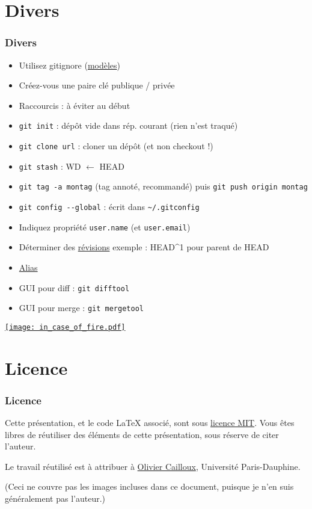 \documentclass[english, french]{beamer}
\begin{document}
\section{Divers}
\begin{frame}
	\frametitle{Divers}
	\vspace{-1pt}
	\begin{itemize}
		\item Utilisez gitignore {\tiny (\href{https://github.com/github/gitignore}{modèles})}
		\item Créez-vous une paire clé publique / privée
		\item Raccourcis : à éviter au début
		\item \texttt{git init} : dépôt vide dans rép. courant (rien n’est traqué)
		\item \texttt{git clone url} : cloner un dépôt (et non checkout !)
		\item \texttt{git stash} : WD $←$ HEAD
		\item \texttt{git tag -a montag} {\tiny (tag annoté, recommandé)} puis \texttt{git push origin montag}
		\item \texttt{git config -{}-global} : écrit dans \texttt{\textasciitilde/.gitconfig}
		\item Indiquez propriété \texttt{user.name} (et \texttt{user.email})
		\item Déterminer des \href{https://git-scm.com/book/en/v2/Git-Tools-Revision-Selection}{révisions} {\tiny exemple : HEAD\textasciicircum 1 pour parent de HEAD}
		\item \href{https://git-scm.com/book/en/v2/Git-Basics-Git-Aliases}{Alias}
		\item GUI pour diff : \texttt{git difftool}
		\item GUI pour merge : \texttt{git mergetool}
	\end{itemize}
\end{frame}

\begin{frame}
	\href{https://github.com/louim/in-case-of-fire}{\texttt{[image: in\_case\_of\_fire.pdf]}}
\end{frame}

\appendix
\AtBeginSection{
}

\section{Licence}
\begin{frame}
	\frametitle{Licence}
	Cette présentation, et le code LaTeX associé, sont sous \href{https://opensource.org/licenses/MIT}{licence MIT}. Vous êtes libres de réutiliser des éléments de cette présentation, sous réserve de citer l’auteur.
	
	Le travail réutilisé est à attribuer à \href{https://www.lamsade.dauphine.fr/~ocailloux/}{Olivier Cailloux}, Université Paris-Dauphine.
	
	\small{(Ceci ne couvre pas les images incluses dans ce document, puisque je n’en suis généralement pas l’auteur.)}
\end{frame}
\end{document}
